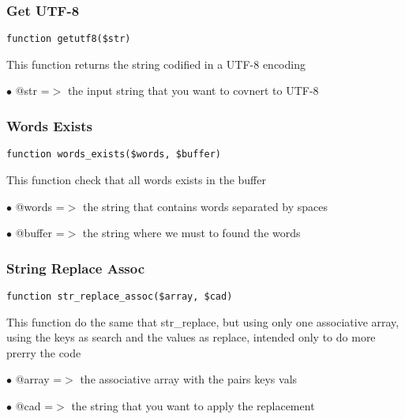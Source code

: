 \documentclass[a4paper]{article}
\begin{document}
\hypertarget{toc246}{}
\subsubsection{Get UTF-8}

\begin{lstlisting}
function getutf8($str)
\end{lstlisting}

This function returns the string codified in a UTF-8 encoding

\begin{compactitem}
\item[\color{myblue}$\bullet$] @str =$>$ the input string that you want to covnert to UTF-8
\end{compactitem}

\hypertarget{toc247}{}
\subsubsection{Words Exists}

\begin{lstlisting}
function words_exists($words, $buffer)
\end{lstlisting}

This function check that all words exists in the buffer

\begin{compactitem}
\item[\color{myblue}$\bullet$] @words  =$>$ the string that contains words separated by spaces
\item[\color{myblue}$\bullet$] @buffer =$>$ the string where we must to found the words
\end{compactitem}

\hypertarget{toc248}{}
\subsubsection{String Replace Assoc}

\begin{lstlisting}
function str_replace_assoc($array, $cad)
\end{lstlisting}

This function do the same that str\_replace, but using only one associative
array, using the keys as search and the values as replace, intended only
to do more prerry the code

\begin{compactitem}
\item[\color{myblue}$\bullet$] @array =$>$ the associative array with the pairs keys vals
\item[\color{myblue}$\bullet$] @cad   =$>$ the string that you want to apply the replacement
\end{compactitem}
\end{document}
